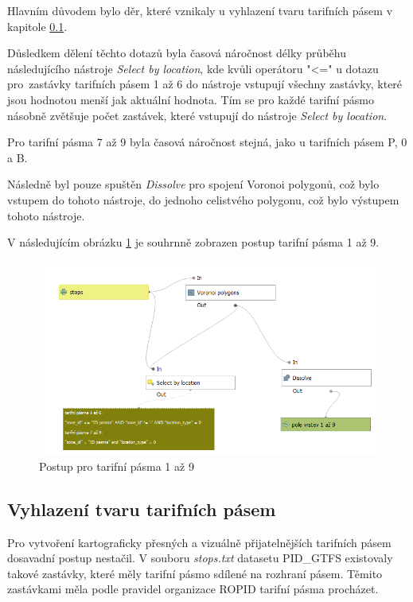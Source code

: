 Hlavním důvodem bylo  děr, které vznikaly u vyhlazení tvaru tarifních pásem v kapitole \ref{vyhlazeni}.  

Důsledkem dělení těchto dotazů byla časová náročnost délky průběhu následujícího nástroje \textit{Select by location}, 
kde kvůli operátoru "<=" u dotazu pro~zastávky tarifních pásem 1 až 6 do nástroje vstupují všechny zastávky, 
které jsou hodnotou  menší jak aktuální hodnota. Tím se pro každé tarifní pásmo násobně zvětšuje počet zastávek,
které vstupují do nástroje \textit{Select by location}.

Pro tarifní pásma 7 až 9 byla časová náročnost stejná, jako u tarifních pásem P, 0 a B.

Následně byl pouze spuštěn \textit{Dissolve} pro spojení Voronoi polygonů, což bylo vstupem do tohoto nástroje,
do jednoho celistvého polygonu, což bylo výstupem tohoto nástroje.

V následujícím obrázku \ref{fig:postup-voronoi-1az9} je souhrnně zobrazen postup tarifní pásma 1 až 9.

\begin{figure}[H] \centering
    \includegraphics[width=400pt]{./pictures/postup-voronoi-1az9.png}
    \caption[Postup pro tarifní pásma 1 až 9]{Postup pro tarifní pásma 1 až 9}
	\label{fig:postup-voronoi-1az9}              
\end{figure}

\subsection{Vyhlazení tvaru tarifních pásem}
\label{vyhlazeni}

Pro vytvoření kartograficky přesných a vizuálně přijatelnějších tarifních pásem dosa\-vadní postup nestačil.
V souboru \textit{stops.txt} datasetu PID\_GTFS existovaly takové zastávky, které měly tarifní pásmo sdílené
na rozhraní pásem. Těmito zastávkami měla podle pravidel organizace ROPID tarifní pásma procházet.

